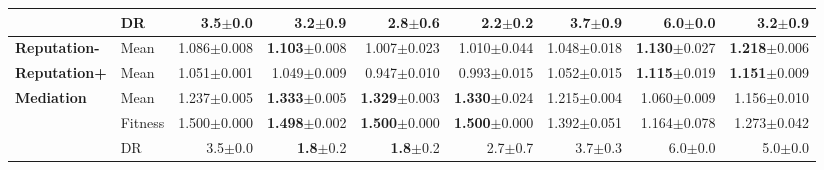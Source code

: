 \begin{table}[htbp]
{\begin{tabular}{ll||r|rrrrrr}
 & DR & 3.5{\scriptsize\color{black!60}$\pm$0.0} & 3.2{\scriptsize\color{black!60}$\pm$0.9} & \textbf{2.8}{\scriptsize\color{black!60}$\pm$0.6} & \textbf{2.2}{\scriptsize\color{black!60}$\pm$0.2} & \textcolor{black!60}{3.7}{\scriptsize\color{black!60}$\pm$0.9} & \textcolor{black!60}{6.0}{\scriptsize\color{black!60}$\pm$0.0} & 3.2{\scriptsize\color{black!60}$\pm$0.9} \\
\midrule
\textbf{Reputation-} & Mean & \cellcolor[HTML]{ABD0E6} 1.086{\scriptsize\color{black!60}$\pm$0.008} & \textbf{1.103}{\scriptsize\color{black!60}$\pm$0.008} & 1.007{\scriptsize\color{black!60}$\pm$0.023} & 1.010{\scriptsize\color{black!60}$\pm$0.044} & 1.048{\scriptsize\color{black!60}$\pm$0.018} & \textbf{1.130}{\scriptsize\color{black!60}$\pm$0.027} & \textbf{1.218}{\scriptsize\color{black!60}$\pm$0.006} \\
\midrule
\textbf{Reputation+} & Mean & \cellcolor[HTML]{99C7E0} 1.051{\scriptsize\color{black!60}$\pm$0.001} & 1.049{\scriptsize\color{black!60}$\pm$0.009} & \textcolor{black!60}{0.947}{\scriptsize\color{black!60}$\pm$0.010} & \textcolor{black!60}{0.993}{\scriptsize\color{black!60}$\pm$0.015} & 1.052{\scriptsize\color{black!60}$\pm$0.015} & \textbf{1.115}{\scriptsize\color{black!60}$\pm$0.019} & \textbf{1.151}{\scriptsize\color{black!60}$\pm$0.009} \\
\midrule
\multirow{3}{*}{\textbf{Mediation}} & Mean & \cellcolor[HTML]{F7FBFD} 1.237{\scriptsize\color{black!60}$\pm$0.005} & \textbf{1.333}{\scriptsize\color{black!60}$\pm$0.005} & \textbf{1.329}{\scriptsize\color{black!60}$\pm$0.003} & \textbf{1.330}{\scriptsize\color{black!60}$\pm$0.024} & 1.215{\scriptsize\color{black!60}$\pm$0.004} & \textcolor{black!60}{1.060}{\scriptsize\color{black!60}$\pm$0.009} & 1.156{\scriptsize\color{black!60}$\pm$0.010} \\
 & Fitness & \cellcolor[HTML]{F2CF80} 1.500{\scriptsize\color{black!60}$\pm$0.000} & \textbf{1.498}{\scriptsize\color{black!60}$\pm$0.002} & \textbf{1.500}{\scriptsize\color{black!60}$\pm$0.000} & \textbf{1.500}{\scriptsize\color{black!60}$\pm$0.000} & 1.392{\scriptsize\color{black!60}$\pm$0.051} & \textcolor{black!60}{1.164}{\scriptsize\color{black!60}$\pm$0.078} & \textcolor{black!60}{1.273}{\scriptsize\color{black!60}$\pm$0.042} \\
 & DR & 3.5{\scriptsize\color{black!60}$\pm$0.0} & \textbf{1.8}{\scriptsize\color{black!60}$\pm$0.2} & \textbf{1.8}{\scriptsize\color{black!60}$\pm$0.2} & 2.7{\scriptsize\color{black!60}$\pm$0.7} & 3.7{\scriptsize\color{black!60}$\pm$0.3} & \textcolor{black!60}{6.0}{\scriptsize\color{black!60}$\pm$0.0} & \textcolor{black!60}{5.0}{\scriptsize\color{black!60}$\pm$0.0} \\

\end{tabular}}
\end{table}
